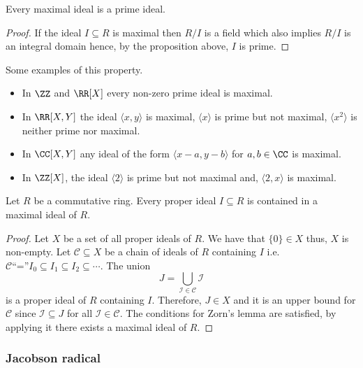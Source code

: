 \documentclass[12pt, a4paper]{article}
\begin{document}
\begin{mdcor}
    Every maximal ideal is a prime ideal.
\end{mdcor}

\begin{proof}
    If the ideal \(I \subseteq R\) is maximal then \(R/I\) is a field which also implies \(R/I\) is an integral domain hence, by the proposition above, \(I\) is prime.
\end{proof}

\begin{mdexample}
    Some examples of this property.
    \begin{itemize}
        \item In \(\ZZ\) and \(\RR[X]\) every non-zero prime ideal is maximal.
        \item In \(\RR[X,Y]\) the ideal \(\langle x,y\rangle\) is maximal, \(\langle x\rangle \) is prime but not maximal, \(\langle x^2 \rangle\) is neither prime nor maximal.
        \item In \(\CC[X,Y]\) any ideal of the form \(\langle x-a,y-b\rangle\) for \(a,b\in \CC\) is maximal.
        \item In \(\ZZ[X]\), the ideal \(\langle 2 \rangle \) is prime but not maximal and, \(\langle 2,x\rangle \) is maximal.
    \end{itemize}
\end{mdexample}

\begin{proposition}
    Let \(R\) be a commutative ring. Every proper ideal \(I \subseteq R\) is contained in a maximal ideal of \(R\).
\end{proposition}

\begin{proof}
    Let \(X\) be a set of all proper ideals of \(R\). We have that \(\{0\} \in X\) thus, \(X\) is non-empty. Let \(\mathcal{C} \subseteq X\) be a chain of ideals of \(R\) containing \(I\) i.e. \(\mathcal{C} \text{``=''} I_0\subseteq I_1 \subseteq I_2 \subseteq \cdots\). The union 
    \[J = \bigcup_{\mathcal{I} \in \mathcal{C}} \mathcal{I}\]
    is a proper ideal of \(R\) containing \(I\). Therefore, \(J \in X\) and it is an upper bound for \(\mathcal{C}\) since \(\mathcal{I} \subseteq J\) for all \(\mathcal{I} \in \mathcal{C}\). The conditions for Zorn's lemma are satisfied, by applying it there exists a maximal ideal of \(R\).
\end{proof}

\subsubsection{Jacobson radical}
\end{document}
